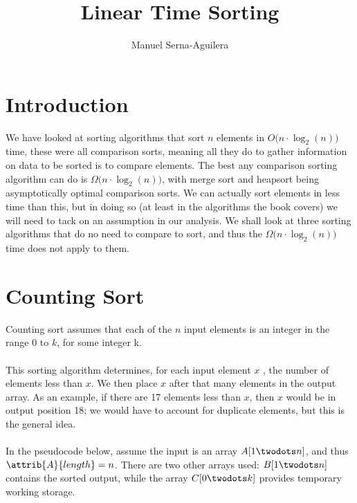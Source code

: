 \documentclass{article}
\title{Linear Time Sorting}
\author{Manuel Serna-Aguilera}
\date{}
\begin{document}
\maketitle

\section*{Introduction}
We have looked at sorting algorithms that sort $n$ elements in $O(n \cdot \log_2{(n))}$ time, these were all comparison sorts, meaning all they do to gather information on data to be sorted is to compare elements. The best any comparison sorting algorithm can do is $\Omega(n \cdot \log_2{(n))}$, with merge sort and heapsort being asymptotically optimal comparison sorts. We can actually sort elements in less time than this, but in doing so (at least in the algorithms the book covers) we will need to tack on an assumption in our analysis. We shall look at three sorting algorithms that do no need to compare to sort, and thus the $\Omega(n \cdot \log_2{(n))}$ time does not apply to them.

\section*{Counting Sort}
Counting sort assumes that each of the $n$ input elements is an integer in the range 0 to $k$,  for some integer k.
\\ \\
This sorting algorithm determines, for each input element $x$ , the number of elements less than $x$. We then place $x$ after that many elements in the output array. As an example, if there are 17 elements less than $x$, then $x$ would be in output position 18; we would have to account for duplicate elements, but this is the general idea.
\\ \\
In the pseudocode below, assume the input is an array $A[1 \twodots n]$, and thus $\attrib{A}{length} = n$. There are two other arrays used: $B[1 \twodots n]$ contains the sorted output,  while the array $C[0 \twodots k]$ provides temporary working storage.

\clearpage
\end{document}
